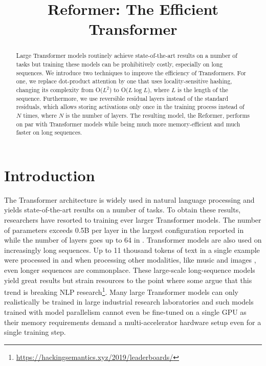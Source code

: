 \title{Reformer: The Efficient Transformer}



\maketitle

\begin{abstract}
Large Transformer models routinely achieve state-of-the-art results on
a number of tasks but training these models can be prohibitively costly,
especially on long sequences. We introduce two techniques to improve
the efficiency of Transformers. For one, we replace dot-product attention
by one that uses locality-sensitive hashing, changing its complexity
from O($L^2$) to O($L\log L$), where $L$ is the length of the sequence.
Furthermore, we use reversible residual layers instead of the standard
residuals, which allows storing activations only once in the training
process instead of $N$ times, where $N$ is the number of layers.
The resulting model, the Reformer, performs on par with Transformer models
while being much more memory-efficient and much faster on long sequences.
\end{abstract}

\section{Introduction}

The Transformer architecture \citep{transformer} is widely used in natural language processing
and yields state-of-the-art results on a number of tasks. To obtain these results,
researchers have resorted to training ever larger Transformer models. The number of parameters exceeds
0.5B per layer in the largest configuration reported in \citep{meshtf} while the number
of layers goes up to 64 in \citep{chartransformer}. Transformer models are also used on
increasingly long sequences. Up to 11 thousand tokens of text in a single example were
processed in \citep{wikipedia} and when processing other modalities, like music \citep{huang2018music}
and images \citep{parmar2018imagetransformer}, even longer sequences are commonplace.
These large-scale long-sequence models yield great results but strain resources to
the point where some argue that this trend is breaking NLP
research\footnote{\url{https://hackingsemantics.xyz/2019/leaderboards/}}.
Many large Transformer models can only realistically be trained in large
industrial research laboratories and such models trained with model parallelism
cannot even be fine-tuned on a single GPU as their memory requirements demand a 
multi-accelerator hardware setup even for a single training step.

